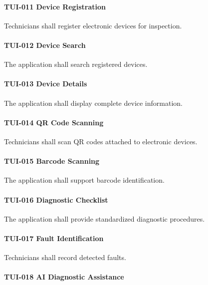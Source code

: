 \paragraph{TUI-011 Device Registration}

Technicians shall register electronic devices for inspection.

\paragraph{TUI-012 Device Search}

The application shall search registered devices.

\paragraph{TUI-013 Device Details}

The application shall display complete device information.

\paragraph{TUI-014 QR Code Scanning}

Technicians shall scan QR codes attached to electronic devices.

\paragraph{TUI-015 Barcode Scanning}

The application shall support barcode identification.

\paragraph{TUI-016 Diagnostic Checklist}

The application shall provide standardized diagnostic procedures.

\paragraph{TUI-017 Fault Identification}

Technicians shall record detected faults.

\paragraph{TUI-018 AI Diagnostic Assistance}

